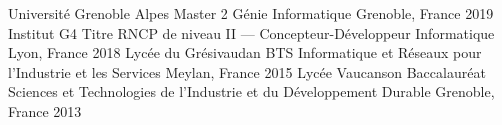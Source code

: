 

\begin{cventries}

  \cventryy
    {Université Grenoble Alpes} %
    {Master 2 Génie Informatique} %
    {Grenoble, France} %
    {2019} %
  \cventryy
    {Institut G4} %
    {Titre RNCP de niveau II — Concepteur-Développeur Informatique} %
    {Lyon, France} %
    {2018} %
  \cventryy
    {Lycée du Grésivaudan} %
    {BTS Informatique et Réseaux pour l'Industrie et les Services} %
    {Meylan, France} %
    {2015} %
  \cventryy
    {Lycée Vaucanson} %
    {Baccalauréat Sciences et Technologies de l'Industrie et du Développement Durable} %
    {Grenoble, France} %
    {2013} %
\end{cventries}

